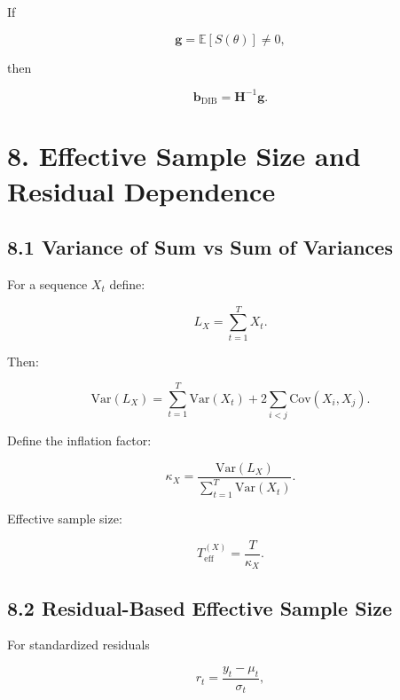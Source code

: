 \documentclass[11pt]{article}
\begin{document}
If

\begin{equation}
\mathbf g = \mathbb{E}[S(\theta)] \neq 0,
\end{equation}

then

\begin{equation}
\mathbf b_{\mathrm{DIB}}
=
\mathbf H^{-1} \mathbf g.
\end{equation}

\section*{8. Effective Sample Size and Residual Dependence}

\subsection*{8.1 Variance of Sum vs Sum of Variances}

For a sequence $X_t$ define:

\begin{equation}
L_X = \sum_{t=1}^T X_t.
\end{equation}

Then:

\begin{equation}
\mathrm{Var}(L_X)
=
\sum_{t=1}^T \mathrm{Var}(X_t)
+
2\sum_{i<j}\mathrm{Cov}(X_i,X_j).
\end{equation}

Define the inflation factor:

\begin{equation}
\kappa_X
=
\frac{\mathrm{Var}(L_X)}
{\sum_{t=1}^T \mathrm{Var}(X_t)}.
\end{equation}

Effective sample size:

\begin{equation}
T_{\mathrm{eff}}^{(X)} = \frac{T}{\kappa_X}.
\end{equation}

\subsection*{8.2 Residual-Based Effective Sample Size}

For standardized residuals

\begin{equation}
r_t = \frac{y_t - \mu_t}{\sigma_t},
\end{equation}
\end{document}

